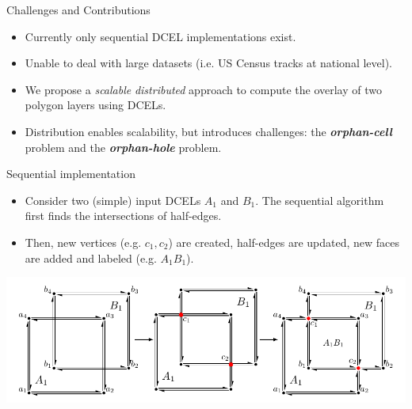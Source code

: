     \begin{frame}{Challenges and Contributions}
        \begin{itemize}
            \item Currently only sequential DCEL implementations exist.
            \item Unable to deal with large datasets (i.e. US Census tracks at national level).
            \item We propose a \textit{scalable} \textit{distributed} approach to compute the overlay of two polygon layers using DCELs.
            \item Distribution enables scalability, but introduces challenges: the \textbf{\textit{orphan-cell}} problem and the \textbf{\textit{orphan-hole}} problem.
        \end{itemize}

    \end{frame}

    \begin{frame}{Sequential implementation}
        \begin{itemize}
                \item Consider two (simple) input DCELs $A_1$ and $B_1$.  The sequential algorithm first finds the intersections of half-edges.
                \item Then, new vertices (e.g. $c_1, c_2$) are created,  half-edges are updated, new faces are added and labeled (e.g. $A_1B_1$).
        \end{itemize}
        \vspace{0.5cm}

        \centering
        \includegraphics[width=\textwidth]{../thesis/chapterSDCEL/dcel2}
    \end{frame}

